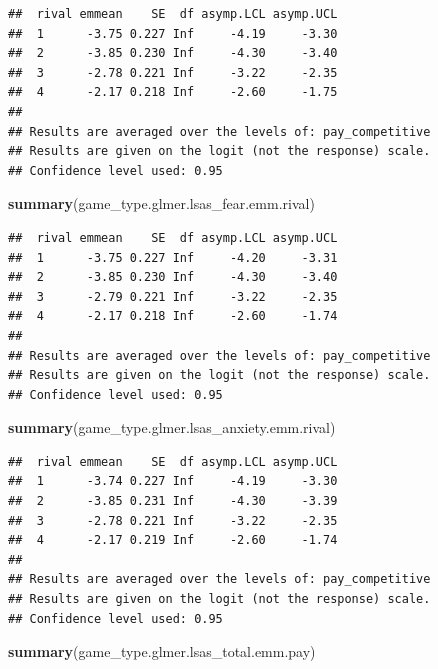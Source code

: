 \documentclass[
]{article}
\newenvironment{Shaded}{\begin{snugshade}}{\end{snugshade}}
\newcommand{\FunctionTok}[1]{\textcolor[rgb]{0.13,0.29,0.53}{\textbf{#1}}}
\newcommand{\NormalTok}[1]{#1}
\begin{document}
\begin{verbatim}
##  rival emmean    SE  df asymp.LCL asymp.UCL
##  1      -3.75 0.227 Inf     -4.19     -3.30
##  2      -3.85 0.230 Inf     -4.30     -3.40
##  3      -2.78 0.221 Inf     -3.22     -2.35
##  4      -2.17 0.218 Inf     -2.60     -1.75
## 
## Results are averaged over the levels of: pay_competitive 
## Results are given on the logit (not the response) scale. 
## Confidence level used: 0.95
\end{verbatim}

\begin{Shaded}
\begin{Highlighting}[]
\FunctionTok{summary}\NormalTok{(game\_type.glmer.lsas\_fear.emm.rival)}
\end{Highlighting}
\end{Shaded}

\begin{verbatim}
##  rival emmean    SE  df asymp.LCL asymp.UCL
##  1      -3.75 0.227 Inf     -4.20     -3.31
##  2      -3.85 0.230 Inf     -4.30     -3.40
##  3      -2.79 0.221 Inf     -3.22     -2.35
##  4      -2.17 0.218 Inf     -2.60     -1.74
## 
## Results are averaged over the levels of: pay_competitive 
## Results are given on the logit (not the response) scale. 
## Confidence level used: 0.95
\end{verbatim}

\begin{Shaded}
\begin{Highlighting}[]
\FunctionTok{summary}\NormalTok{(game\_type.glmer.lsas\_anxiety.emm.rival)}
\end{Highlighting}
\end{Shaded}

\begin{verbatim}
##  rival emmean    SE  df asymp.LCL asymp.UCL
##  1      -3.74 0.227 Inf     -4.19     -3.30
##  2      -3.85 0.231 Inf     -4.30     -3.39
##  3      -2.78 0.221 Inf     -3.22     -2.35
##  4      -2.17 0.219 Inf     -2.60     -1.74
## 
## Results are averaged over the levels of: pay_competitive 
## Results are given on the logit (not the response) scale. 
## Confidence level used: 0.95
\end{verbatim}

\begin{Shaded}
\begin{Highlighting}[]
\FunctionTok{summary}\NormalTok{(game\_type.glmer.lsas\_total.emm.pay)}
\end{Highlighting}
\end{Shaded}
\end{document}
